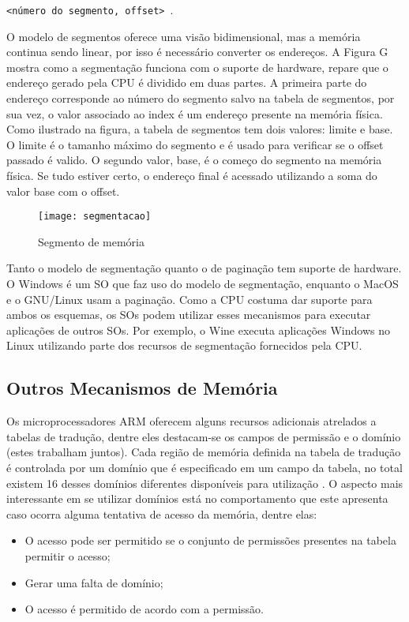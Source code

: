 \texttt{<número do segmento, offset>}~\citep{silberschatz}.

O modelo de segmentos oferece uma visão bidimensional, mas a memória continua
sendo linear, por isso é necessário converter os endereços.
A Figura G mostra como a segmentação funciona com o suporte de hardware, repare
que o endereço gerado pela CPU é dividido em duas partes. A primeira parte do
endereço corresponde ao número do segmento salvo na tabela de segmentos, por
sua vez, o valor associado ao index é um endereço presente na memória física.
Como ilustrado na figura, a tabela de segmentos tem dois valores: limite e
base. O limite é o tamanho máximo do segmento e é usado para verificar se o
offset passado é valido. O segundo valor, base, é o começo do segmento na
memória física. Se tudo estiver certo, o endereço final é acessado utilizando a
soma do valor base com o offset.

\begin{figure}[!h]
  \centering
  \texttt{[image: segmentacao]} 
  \caption{Segmento de memória}
  \label{fig:memory_segment} 
\end{figure}

Tanto o modelo de segmentação quanto o de paginação tem suporte de hardware. O
Windows é um SO que faz uso do modelo de segmentação, enquanto o MacOS e o
GNU/Linux usam a paginação. Como a CPU costuma dar suporte para ambos os
esquemas, os SOs podem utilizar esses mecanismos para executar aplicações de
outros SOs. Por exemplo, o Wine executa aplicações Windows no Linux utilizando
parte dos recursos de segmentação fornecidos pela CPU.

\subsection{Outros Mecanismos de Memória}
\label{sec:outros_mecanismos_memoria}

Os microprocessadores ARM oferecem alguns recursos adicionais atrelados a
tabelas de tradução, dentre eles destacam-se os campos de permissão e o domínio
(estes trabalham juntos). Cada região de memória definida na tabela de tradução
é controlada por um domínio que é especificado em um campo da tabela, no total
existem 16 desses domínios diferentes disponíveis para utilização
\cite{armdeveloperguide}. O aspecto mais interessante em se utilizar domínios
está no comportamento que este apresenta caso ocorra alguma tentativa de acesso
da memória, dentre elas:

\begin{itemize}
  \item O acesso pode ser permitido se o conjunto de permissões presentes na
        tabela permitir o acesso;
  \item Gerar uma falta de domínio;
  \item O acesso é permitido de acordo com a permissão.
\end{itemize}


